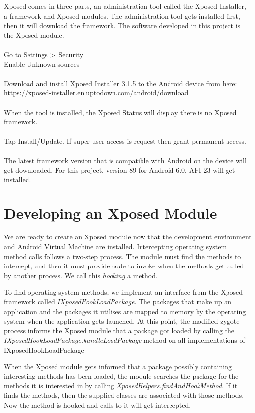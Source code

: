 Xposed comes in three parts, an administration tool called the Xposed Installer, a framework and Xposed modules.  The administration tool gets installed first, then it will download the framework.  The software developed in this project is the Xposed module.\\
\\
Go to Settings \textgreater\ Security\\
\indent Enable Unknown sources\\
\\
Download and install Xposed Installer 3.1.5 to the Android device from here:\\
\url{https://xposed-installer.en.uptodown.com/android/download}\\
\\
When the tool is installed, the Xposed Status will display there is no Xposed framework.\\
\\
Tap Install/Update.  If super user access is request then grant permanent access.\\
\\
The latest framework version that is compatible with Android on the device will get downloaded.  For this project, version 89 for Android 6.0, API 23 will get installed.

\section{Developing an Xposed Module}
\label{sec:Developing an Xposed module}

We are ready to create an Xposed module now that the development environment and Android Virtual Machine are installed.  Intercepting operating system method calls follows a two-step process.  The module must find the methods to intercept, and then it must provide code to invoke when the methods get called by another process.  We call this \emph{hooking} a method.

To find operating system methods, we implement an interface from the Xposed framework called \emph{IXposedHookLoadPackage}.  The packages that make up an application and the packages it utilises are mapped to memory by the operating system when the application gets launched.  At this point, the modified zygote process informs the Xposed module that a package got loaded by calling the \emph{IXposedHookLoadPackage.handleLoadPackage} method on all implementations of IXposedHookLoadPackage.

When the Xposed module gets informed that a package possibly containing interesting methods has been loaded, the module searches the package for the methods it is interested in by calling \emph{XposedHelpers.findAndHookMethod}.  If it finds the methods, then the supplied classes are associated with those methods.  Now the method is hooked and calls to it will get intercepted.

